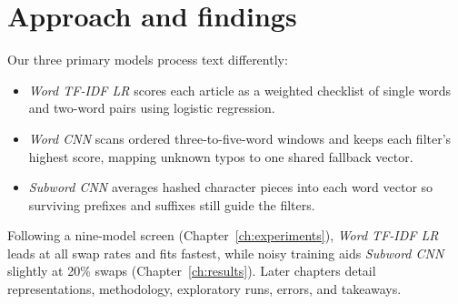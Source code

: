 \section{Approach and findings}
Our three primary models process text differently:
\begin{itemize}
\setlength{\itemsep}{2pt}\setlength{\parskip}{2pt}
\item \textit{Word TF-IDF LR} scores each article as a weighted checklist of single words and two-word pairs using logistic regression.
\item \textit{Word CNN} scans ordered three-to-five-word windows and keeps each filter's highest score, mapping unknown typos to one shared fallback vector.
\item \textit{Subword CNN} averages hashed character pieces into each word vector so surviving prefixes and suffixes still guide the filters.
\end{itemize}

Following a nine-model screen (Chapter~\ref{ch:experiments}), \textit{Word TF-IDF LR} leads at all swap rates and fits fastest, while noisy training aids \textit{Subword CNN} slightly at 20\% swaps (Chapter~\ref{ch:results}). Later chapters detail representations, methodology, exploratory runs, errors, and takeaways.
